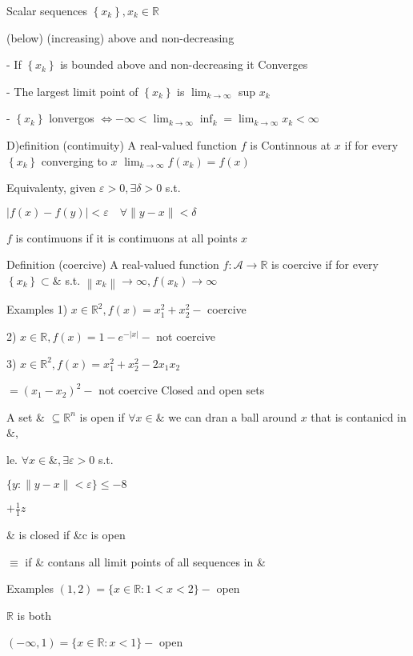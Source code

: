 \documentclass[11pt,a4paper]{article}
\begin{document}
Scalar sequences $\left\{x_{k}\right\}, x_{k} \in \mathbb{R}$

(below) (increasing)
above and non-decreasing

- If $\left\{x_{k}\right\}$ is bounded above and non-decreasing it Converges

- The largest limit point of $\left\{x_{k}\right\}$ is $\lim _{k \rightarrow \infty}$ sup $x_{k}$

- $\left\{x_{k}\right\}$ lonvergos $\Longleftrightarrow-\infty<\lim _{k \rightarrow \infty} \inf _{k}=\lim _{k \rightarrow \infty} x_{k}<\infty$

D)efinition (contimuity) A real-valued function $f$ is Continnous at $x$ if for every $\left\{x_{k}\right\}$ converging to $x$ $\lim _{k \rightarrow \infty} f\left(x_{k}\right)=f(x)$

Equivalenty, given $\varepsilon>0, \exists \delta>0$ s.t.

$|f(x)-f(y)|<\varepsilon \quad \forall\|y-x\|<\delta$

$f$ is contimuons if it is contimuons at all points $x$

Definition (coercive) A real-valued function $f: \mathcal{A} \rightarrow \mathbb{R}$ is coercive if for every $\left\{x_{k}\right\} \subset \&$ s.t. $\left\|x_{k}\right\| \rightarrow \infty, f\left(x_{k}\right) \rightarrow \infty$

Examples 1) $x \in \mathbb{R}^{2}, f(x)=x_{1}^{2}+x_{2}^{2}-$ coercive

2) $x \in \mathbb{R}, f(x)=1-e^{-|x|}-$ not coercive

3) $x \in \mathbb{R}^{2}, f(x)=x_{1}^{2}+x_{2}^{2}-2 x_{1} x_{2}$

$=\left(x_{1}-x_{2}\right)^{2}-$ not coercive Closed and open sets

A set \& $\subseteq \mathbb{R}^{n}$ is open if $\forall x \in \&$ we can dran a ball around $x$ that is contanicd in $\&$,

le. $\forall x \in \&, \exists \varepsilon>0$ s.t.

$\{y:\|y-x\|<\varepsilon\} \leq-8$

$+\frac{1}{1} z$

\& is closed if \&c is open

$\equiv$ if \& contans all limit points of all sequences in \&

Examples $(1,2)=\{x \in \mathbb{R}: 1<x<2\}-$ open

$\mathbb{R}$ is both

$(-\infty, 1)=\{x \in \mathbb{R}: x<1\}-$ open
\end{document}
